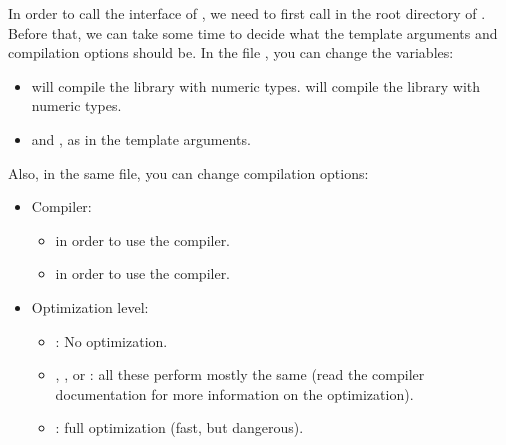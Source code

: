 \documentclass[10pt,utf8,compress,xcolor=dvipsnames]{beamer}
\begin{document}
\begin{frame}[fragile]{}
	In order to call the \PY interface of \mimes, we need to first call  in the root directory of \mimes.\\[0.2cm]
	
	Before that, we can take some time to decide what the template arguments and compilation  options should be. In the 
	file , you can change the variables:
	\begin{itemize}
		\item {} will compile the library with  numeric types.  will compile the library with  numeric types.
		\item {} and , as in the template arguments.
	\end{itemize}
	
	Also, in the same file, you can change compilation options:
	\begin{itemize}
		\item Compiler:
		\begin{itemize}
			\item {} in order to use the  \CPP compiler.
			\item {} in order to use the  \CPP compiler.
		\end{itemize}
		\item Optimization level:
		\begin{itemize}
			\item {}: No optimization. 
			\item {}, , or : all these perform mostly the same (read the compiler documentation for more information on the optimization).
			\item {}: full optimization (fast, but dangerous). 
		\end{itemize}
	\end{itemize}
\end{frame}
\end{document}
